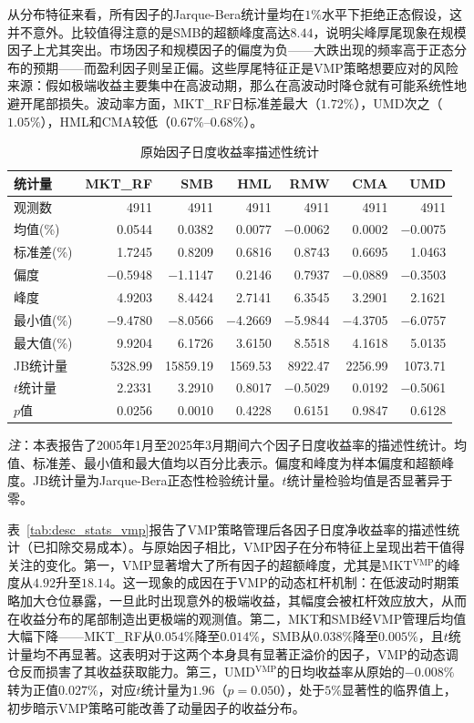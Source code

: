 \documentclass[
    decl-page,
    oneside,
  ]{njuthesis}
\begin{document}
从分布特征来看，所有因子的Jarque-Bera统计量均在$1\%$水平下拒绝正态假设，这并不意外。比较值得注意的是SMB的超额峰度高达$8.44$，说明尖峰厚尾现象在规模因子上尤其突出。市场因子和规模因子的偏度为负——大跌出现的频率高于正态分布的预期——而盈利因子则呈正偏。这些厚尾特征正是VMP策略想要应对的风险来源：假如极端收益主要集中在高波动期，那么在高波动时降仓就有可能系统性地避开尾部损失。波动率方面，MKT\_RF日标准差最大（$1.72\%$），UMD次之（$1.05\%$），HML和CMA较低（$0.67\%$--$0.68\%$）。

\begin{table}[htbp]
\centering
\caption{原始因子日度收益率描述性统计}
\label{tab:desc_stats_raw}
\small
\begin{tabular}{l*{6}{r}}
\toprule
统计量 & MKT\_RF & SMB & HML & RMW & CMA & UMD \\
\midrule
观测数 & 4911 & 4911 & 4911 & 4911 & 4911 & 4911 \\
均值(\%) & 0.0544 & 0.0382 & 0.0077 & $-$0.0062 & 0.0002 & $-$0.0075 \\
标准差(\%) & 1.7245 & 0.8209 & 0.6816 & 0.8743 & 0.6695 & 1.0463 \\
偏度 & $-$0.5948 & $-$1.1147 & 0.2146 & 0.7937 & $-$0.0889 & $-$0.3503 \\
峰度 & 4.9203 & 8.4424 & 2.7141 & 6.3545 & 3.2901 & 2.1621 \\
最小值(\%) & $-$9.4780 & $-$8.0566 & $-$4.2669 & $-$5.9844 & $-$4.3705 & $-$6.0757 \\
最大值(\%) & 9.9204 & 6.1726 & 3.6150 & 8.5518 & 4.1618 & 5.0135 \\
\midrule
JB统计量 & 5328.99 & 15859.19 & 1569.53 & 8922.47 & 2256.99 & 1073.71 \\
$t$统计量 & 2.2331 & 3.2910 & 0.8017 & $-$0.5029 & 0.0192 & $-$0.5061 \\
$p$值 & 0.0256 & 0.0010 & 0.4228 & 0.6151 & 0.9847 & 0.6128 \\
\bottomrule
\end{tabular}

\vspace{0.5em}
\begin{minipage}{0.95\textwidth}
\footnotesize
\textit{注}：本表报告了2005年1月至2025年3月期间六个因子日度收益率的描述性统计。均值、标准差、最小值和最大值均以百分比表示。偏度和峰度为样本偏度和超额峰度。JB统计量为Jarque-Bera正态性检验统计量。$t$统计量检验均值是否显著异于零。
\end{minipage}
\end{table}

表~\ref{tab:desc_stats_vmp}报告了VMP策略管理后各因子日度净收益率的描述性统计（已扣除交易成本）。与原始因子相比，VMP因子在分布特征上呈现出若干值得关注的变化。第一，VMP显著增大了所有因子的超额峰度，尤其是MKT$^{\text{VMP}}$的峰度从$4.92$升至$18.14$。这一现象的成因在于VMP的动态杠杆机制：在低波动时期策略加大仓位暴露，一旦此时出现意外的极端收益，其幅度会被杠杆效应放大，从而在收益分布的尾部制造出更极端的观测值。第二，MKT和SMB经VMP管理后均值大幅下降——MKT\_RF从$0.054\%$降至$0.014\%$，SMB从$0.038\%$降至$0.005\%$，且$t$统计量均不再显著。这表明对于这两个本身具有显著正溢价的因子，VMP的动态调仓反而损害了其收益获取能力。第三，UMD$^{\text{VMP}}$的日均收益率从原始的$-0.008\%$转为正值$0.027\%$，对应$t$统计量为$1.96$（$p=0.050$），处于$5\%$显著性的临界值上，初步暗示VMP策略可能改善了动量因子的收益分布。
\end{document}
